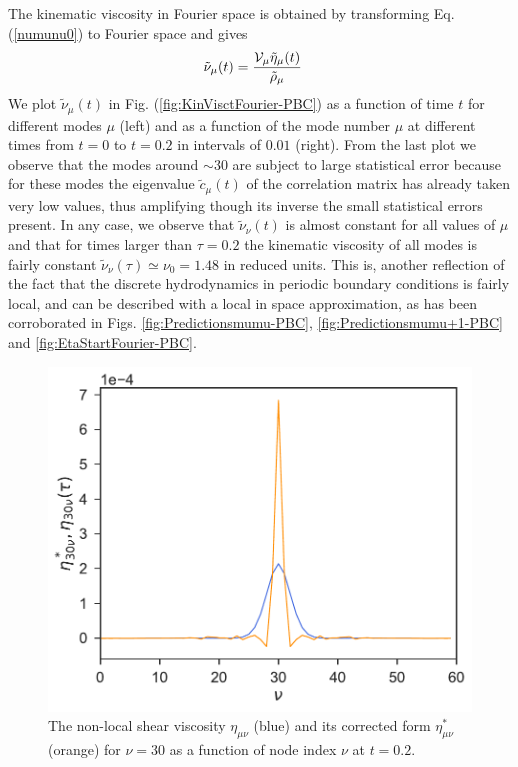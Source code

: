\documentclass[a4paper,openright,12pt]{book}
\begin{document}
The kinematic viscosity  in Fourier space is  obtained by transforming Eq. (\ref{numunu0})
to Fourier space  and gives
\begin{align}
\tilde{\nu}_\mu(t)&=  \frac{{\cal V}_\mu \tilde{\eta}_\mu(t)}{\tilde{\rho}_\mu}
\end{align}
We plot $\tilde{\nu}_\mu(t)$  in Fig.  (\ref{fig:KinVisctFourier-PBC}) as a  function of time
$t$ for  different modes  $\mu$ (left)  and as a  function of  the mode
number $\mu$  at different times from $t=0$ to $t=0.2$ in intervals of $0.01$ (right). From
the last plot  we observe that the modes around  $\sim 30$ are subject
to  large statistical  error because  for these  modes the  eigenvalue
$\tilde{c}_\mu(t)$ of  the correlation  matrix has already  taken very
low values, thus  amplifying though its inverse  the small statistical
errors present. In  any case, we observe  that $\tilde{\nu}_\nu(t)$ is
almost constant for all values of $\mu$ and that for times larger than
$\tau=0.2$ the  kinematic viscosity  of all  modes is  fairly constant
$\tilde{\nu}_\nu(\tau)\simeq\nu_0=1.48$  in  reduced units.  This  is,
another reflection  of the  fact that the  discrete hydrodynamics in 
periodic boundary conditions is fairly local, and can be described with
 a local in space approximation, as has been corroborated in Figs. 
 \ref{fig:Predictionsmumu-PBC}, \ref{fig:Predictionsmumu+1-PBC} and \ref{fig:EtaStartFourier-PBC}.


\begin{figure}[h!]
  \centering
\includegraphics[scale=0.45]{CompareEtas-PBC}
\caption[Comparison $\eta^*_{30,\nu}$ and $eta_{30,\nu}$]{The non-local shear viscosity $\eta_{\mu\nu}$ (blue) and its corrected form $\eta^*_{\mu\nu}$ (orange) for $\nu=30$ as a function of node index $\nu$ at $t=0.2$.}
\label{fig:CompareEtas-PBC}
\end{figure}
\end{document}
